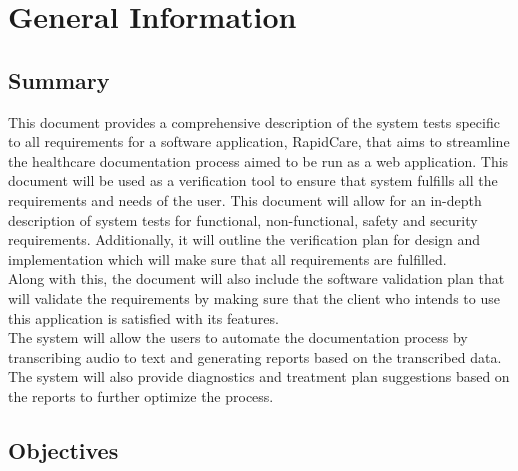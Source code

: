 \documentclass[12pt, titlepage]{article}
\begin{document}

\newpage


\section{General Information} \label{section:2}

\subsection{Summary} \label{section:2.1}

This document provides a comprehensive description of the system tests specific to all requirements for a software application, RapidCare, that aims to streamline the healthcare documentation process aimed to be run as a web application. This document will be used as a verification tool to ensure that system fulfills all the requirements and needs of the user.
This document will allow for an in-depth description of system tests for functional, non-functional, safety and security requirements. Additionally, it will outline the verification plan for design and implementation which will make sure that all requirements are fulfilled.\\
Along with this, the document will also include the software validation plan that will validate the requirements by making sure that the client who intends to use this application is satisfied with its features.\\
The system will allow the users to automate the documentation process by transcribing audio to text and generating reports based on the transcribed data. The system will also provide diagnostics and treatment plan suggestions based on the reports to further optimize the process.    

\subsection{Objectives} \label{section:2.2}
\end{document}
